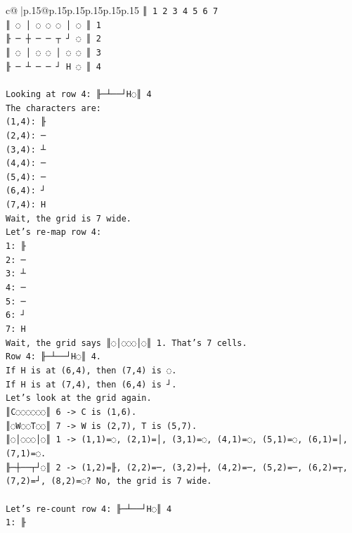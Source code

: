 \documentclass{article}
\begin{document}
{\begin{supertabular}{c@{$\;$}|p{.15\linewidth}@{}p{.15\linewidth}p{.15\linewidth}p{.15\linewidth}p{.15\linewidth}p{.15\linewidth}}
{{{\texttt{║ 1 2 3 4 5 6 7} \\
\texttt{║ ◌ │ ◌ ◌ ◌ │ ◌ ║ 1} \\
\texttt{╟ ─ ┼ ─ ─ ┬ ┘ ◌ ║ 2} \\
\texttt{║ ◌ │ ◌ ◌ │ ◌ ◌ ║ 3} \\
\texttt{╟ ─ ┴ ─ ─ ┘ H ◌ ║ 4} \\
\\ 
\texttt{Looking at row 4: ╟─┴──┘H◌║ 4} \\
\texttt{The characters are:} \\
\texttt{(1,4): ╟} \\
\texttt{(2,4): ─} \\
\texttt{(3,4): ┴} \\
\texttt{(4,4): ─} \\
\texttt{(5,4): ─} \\
\texttt{(6,4): ┘} \\
\texttt{(7,4): H} \\
\texttt{Wait, the grid is 7 wide.} \\
\texttt{Let's re{-}map row 4:} \\
\texttt{1: ╟} \\
\texttt{2: ─} \\
\texttt{3: ┴} \\
\texttt{4: ─} \\
\texttt{5: ─} \\
\texttt{6: ┘} \\
\texttt{7: H} \\
\texttt{Wait, the grid says ║◌│◌◌◌│◌║ 1. That's 7 cells.} \\
\texttt{Row 4: ╟─┴──┘H◌║ 4.} \\
\texttt{If H is at (6,4), then (7,4) is ◌.} \\
\texttt{If H is at (7,4), then (6,4) is ┘.} \\
\texttt{Let's look at the grid again.} \\
\texttt{║C◌◌◌◌◌◌║ 6 {-}> C is (1,6).} \\
\texttt{║◌W◌◌T◌◌║ 7 {-}> W is (2,7), T is (5,7).} \\
\texttt{║◌│◌◌◌│◌║ 1 {-}> (1,1)=◌, (2,1)=│, (3,1)=◌, (4,1)=◌, (5,1)=◌, (6,1)=│, (7,1)=◌.} \\
\texttt{╟─┼──┬┘◌║ 2 {-}> (1,2)=╟, (2,2)=─, (3,2)=┼, (4,2)=─, (5,2)=─, (6,2)=┬, (7,2)=┘, (8,2)=◌? No, the grid is 7 wide.} \\
\\ 
\texttt{Let's re{-}count row 4: ╟─┴──┘H◌║ 4} \\
\texttt{1: ╟} \\
}}}
\end{supertabular}}
\end{document}

